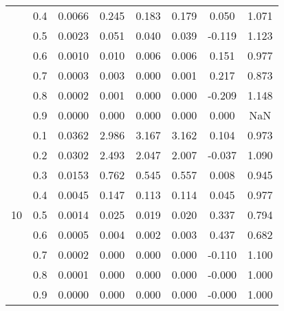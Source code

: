 \documentclass[11pt,a4paper]{report}
\begin{document}
\begin{longtable}{ | c | c || c | c | c | c | c | c | }
 & 0.4 & 0.0066 & 0.245 & 0.183 & 0.179 & 0.050 & 1.071 \\
 & 0.5 & 0.0023 & 0.051 & 0.040 & 0.039 & -0.119 & 1.123 \\
 & 0.6 & 0.0010 & 0.010 & 0.006 & 0.006 & 0.151 & 0.977 \\
 & 0.7 & 0.0003 & 0.003 & 0.000 & 0.001 & 0.217 & 0.873 \\
 & 0.8 & 0.0002 & 0.001 & 0.000 & 0.000 & -0.209 & 1.148 \\
 & 0.9 & 0.0000 & 0.000 & 0.000 & 0.000 & 0.000 & NaN \\
 \hline
\multirow{9}{*}{10} & 0.1 & 0.0362 & 2.986 & 3.167 & 3.162 & 0.104 & 0.973 \\
 & 0.2 & 0.0302 & 2.493 & 2.047 & 2.007 & -0.037 & 1.090 \\
 & 0.3 & 0.0153 & 0.762 & 0.545 & 0.557 & 0.008 & 0.945 \\
 & 0.4 & 0.0045 & 0.147 & 0.113 & 0.114 & 0.045 & 0.977 \\
 & 0.5 & 0.0014 & 0.025 & 0.019 & 0.020 & 0.337 & 0.794 \\
 & 0.6 & 0.0005 & 0.004 & 0.002 & 0.003 & 0.437 & 0.682 \\
 & 0.7 & 0.0002 & 0.000 & 0.000 & 0.000 & -0.110 & 1.100 \\
 & 0.8 & 0.0001 & 0.000 & 0.000 & 0.000 & -0.000 & 1.000 \\
 & 0.9 & 0.0000 & 0.000 & 0.000 & 0.000 & -0.000 & 1.000 \\
 \hline
\hline
\end{longtable}
\end{document}
